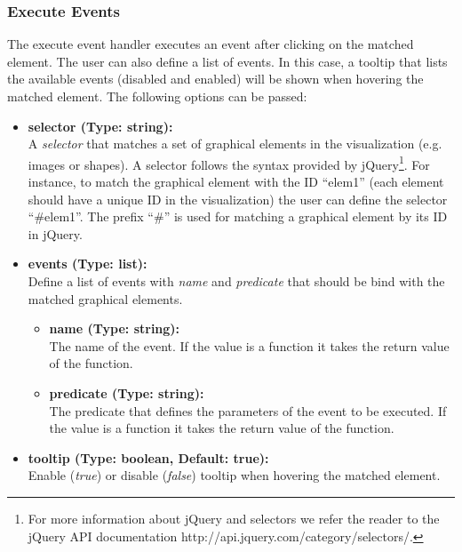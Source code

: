 \subsubsection{Execute Events}

The execute event handler executes an event after clicking on the matched element.
The user can also define a list of events.
In this case, a tooltip that lists the available events (disabled and enabled) will be shown when hovering the matched element.
The following options can be passed:

\begin{itemize}

\item[] \textbf{selector (Type: string):}\\ A \textit{selector} that matches a set of graphical elements in the visualization (e.g. images or shapes). 
A selector follows the syntax provided by jQuery\footnote{For more information about jQuery and selectors we refer the reader to the jQuery
API documentation http://api.jquery.com/category/selectors/.}. 
For instance, to match the graphical element with the ID ``elem1'' (each element should have a unique ID in the visualization) the user can define the selector ``\#elem1''.
The prefix ``\#'' is used for matching a graphical element by its ID in jQuery.

\item[] \textbf{events (Type: list):}\\
Define a list of events with \textit{name} and \textit{predicate} that should be bind with the matched graphical elements.

\begin{itemize}

\item[] \textbf{name (Type: string):}\\
The name of the event. 
If the value is a function it takes the return value of the function.

\item[] \textbf{predicate (Type: string):}\\
The predicate that defines the parameters of the event to be executed.
If the value is a function it takes the return value of the function.

\end{itemize}

\item[] \textbf{tooltip (Type: boolean, Default: true):}\\
 Enable (\textit{true}) or disable (\textit{false}) tooltip when hovering the matched element.
	
\end{itemize}

